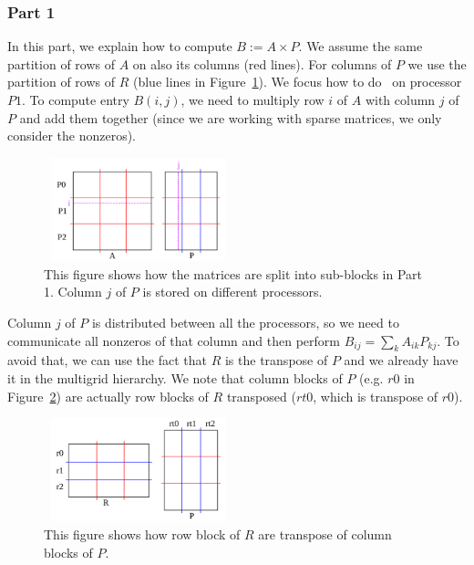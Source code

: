 \subsubsection{Part 1}

In this part, we explain how to compute $B := A \times P$. We assume the same partition of rows of $A$ on also its columns (red lines). For columns of $P$ we use the partition of rows of $R$ (blue lines in Figure~\ref{fig:part1b}).
We focus how to do \mm ~on processor $P1$. To compute entry $B(i, j)$, we need to multiply row $i$ of $A$ with column $j$ of $P$ and add them together (since we are working with sparse matrices, we only consider the nonzeros).

\begin{figure}[tbh]
 \centering
 \includegraphics[width=5.5cm,height=3cm]{./figures/part1b.pdf}
 \caption{This figure shows how the matrices are split into sub-blocks in Part 1. Column $j$ of $P$ is stored on different processors.}
 \label{fig:part1b}
\end{figure}

Column $j$ of $P$ is distributed between all the processors, so we need to communicate all nonzeros of that column and then perform $B_{ij} = \sum_{k} A_{ik} P_{kj}$. To avoid that, we can use the fact that $R$ is the transpose of $P$ and we already have it in the multigrid hierarchy. We note that column blocks of $P$ (e.g. $r0$ in Figure~\ref{fig:part1c}) are actually row blocks of $R$ transposed ($rt0$, which is transpose of $r0$).

\begin{figure}[tbh]
 \centering
 \includegraphics[width=5.5cm,height=3cm]{./figures/part1c.pdf}
 \caption{This figure shows how row block of $R$ are transpose of column blocks of $P$.}
 \label{fig:part1c}
\end{figure}


